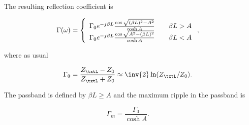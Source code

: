 The resulting reflection coefficient is 

\begin{equation}\label{eqn:continuumAndOtherTransformersCore:1080}
\Gamma(\omega) 
= 
\left\{
\begin{array}{l l}
\Gamma_0 e^{-j \beta L} \frac{\cos\sqrt{(\beta L)^2 - A^2}}{\cosh A} & \quad \mbox{\( \beta L > A \)} \\
\Gamma_0 e^{-j \beta L} \frac{\cos\sqrt{A^2 - (\beta L)^2 }}{\cosh A} & \quad \mbox{\( \beta L < A \)} \\
\end{array}
\right.,
\end{equation}

where as usual

\begin{equation}\label{eqn:continuumAndOtherTransformersCore:1100}
\Gamma_0 = \frac{Z_\txtL - Z_0}{Z_\txtL + Z_0} \approx \inv{2} \ln (Z_\txtL/Z_0).
\end{equation}

The passband is defined by \( \beta L \ge A \) and the maximum ripple in the passband is

\begin{equation}\label{eqn:continuumAndOtherTransformersCore:1120}
\Gamma_m = \frac{\Gamma_0}{\cosh A}.
\end{equation}

